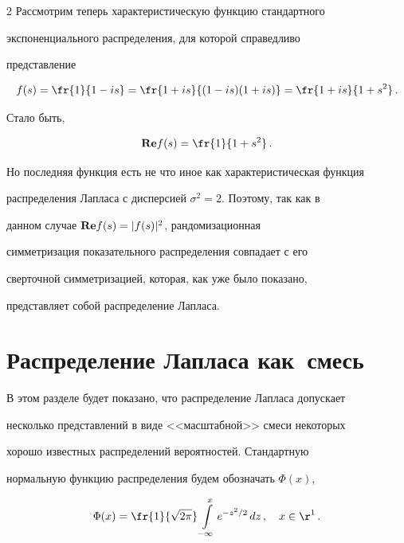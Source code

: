 \begin{multicols}{2}
Рассмотрим теперь характеристическую функцию стандартного


экспоненциального распределения, для которой справедливо


представление


$$


f(s)=\fr{1}{1-is}=\fr{1+is}{(1-is)(1+is)}=\fr{1+is}{1+s^2}\,.


$$


Стало быть,


$$


{\bf Re}f(s)=\fr{1}{1+s^2}\,.


$$


Но последняя функция есть не что иное как характеристическая функция


распределения Лапласа с дисперсией $\sigma^2=2$. Поэтому, так как в


данном случае ${\bf Re}f(s)=|f(s)|^2$, рандомизационная


сим\-мет\-ри\-за\-ция показательного распределения совпадает с его


сверточной симметризацией, которая, как уже было показано,


представляет собой распределение Лапласа.





\section{Распределение Лапласа как~смесь}





В этом разделе будет показано, что распределение Лапласа допускает


несколько представлений в виде <<масштабной>> смеси некоторых


хорошо известных распределений вероятностей. Стандартную


нормальную функцию распределения будем обозначать $\Phi(x)$,


$$


\Phi(x)=\fr{1}{\sqrt{2\pi}}\int\limits_{-\infty}^{x}e^{-z^2/2}\,dz\,,\quad


 x\in{\r}^1\,.


$$





\medskip





\noindent



\end{multicols}
